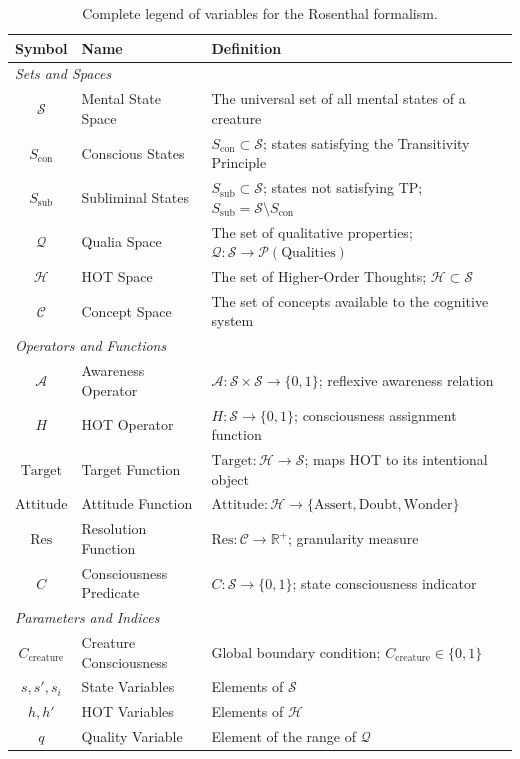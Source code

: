 \documentclass[11pt,a4paper]{article}
\theoremstyle{definition}
\theoremstyle{remark}
\newcommand{\Sset}{\mathcal{S}}
\newcommand{\Q}{\mathcal{Q}}
\newcommand{\Hset}{\mathcal{H}}
\newcommand{\A}{\mathcal{A}}
\newcommand{\Scon}{S_{\text{con}}}
\newcommand{\Ssub}{S_{\text{sub}}}
\newcommand{\Ccreature}{C_{\text{creature}}}
\newcommand{\Concept}{\mathcal{C}}
\newcommand{\Res}{\text{Res}}
\newcommand{\Target}{\text{Target}}
\newcommand{\Attitude}{\text{Attitude}}
\begin{document}
\vspace{1em}

\begin{table}[ht]
\centering
\begin{tabular}{@{}clp{8cm}@{}}
\toprule
\textbf{Symbol} & \textbf{Name} & \textbf{Definition} \\
\midrule
\multicolumn{3}{l}{\textit{Sets and Spaces}} \\
$\Sset$ & Mental State Space & The universal set of all mental states of a creature \\
$\Scon$ & Conscious States & $\Scon \subset \Sset$; states satisfying the Transitivity Principle \\
$\Ssub$ & Subliminal States & $\Ssub \subset \Sset$; states not satisfying TP; $\Ssub = \Sset \setminus \Scon$ \\
$\Q$ & Qualia Space & The set of qualitative properties; $\Q: \Sset \to \mathcal{P}(\text{Qualities})$ \\
$\Hset$ & HOT Space & The set of Higher-Order Thoughts; $\Hset \subset \Sset$ \\
$\Concept$ & Concept Space & The set of concepts available to the cognitive system \\
\midrule
\multicolumn{3}{l}{\textit{Operators and Functions}} \\
$\A$ & Awareness Operator & $\A: \Sset \times \Sset \to \{0,1\}$; reflexive awareness relation \\
$H$ & HOT Operator & $H: \Sset \to \{0,1\}$; consciousness assignment function \\
$\Target$ & Target Function & $\Target: \Hset \to \Sset$; maps HOT to its intentional object \\
$\Attitude$ & Attitude Function & $\Attitude: \Hset \to \{\text{Assert}, \text{Doubt}, \text{Wonder}\}$ \\
$\Res$ & Resolution Function & $\Res: \Concept \to \mathbb{R}^+$; granularity measure \\
$C$ & Consciousness Predicate & $C: \Sset \to \{0,1\}$; state consciousness indicator \\
\midrule
\multicolumn{3}{l}{\textit{Parameters and Indices}} \\
$\Ccreature$ & Creature Consciousness & Global boundary condition; $\Ccreature \in \{0,1\}$ \\
$s, s', s_i$ & State Variables & Elements of $\Sset$ \\
$h, h'$ & HOT Variables & Elements of $\Hset$ \\
$q$ & Quality Variable & Element of the range of $\Q$ \\
\bottomrule
\end{tabular}
\caption{Complete legend of variables for the Rosenthal formalism.}
\label{tab:legend}
\end{table}
\end{document}
